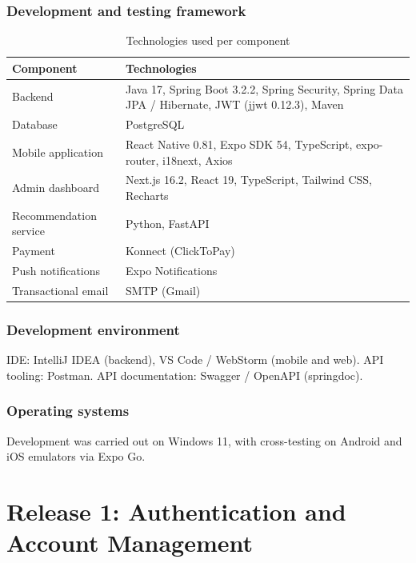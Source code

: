 \documentclass[a4paper,12pt]{report}
\begin{document}
\subsection{Development and testing framework}
\begin{table}[H]
\centering
\caption{Technologies used per component}
\begin{tabular}{|P{3.5cm}|P{9cm}|}
\hline
{}
\textbf{Component} & \textbf{Technologies} \\
\hline
Backend & Java 17, Spring Boot 3.2.2, Spring Security, Spring Data JPA / Hibernate, JWT (jjwt 0.12.3), Maven \\
\hline
Database & PostgreSQL \\
\hline
Mobile application & React Native 0.81, Expo SDK 54, TypeScript, expo-router, i18next, Axios \\
\hline
Admin dashboard & Next.js 16.2, React 19, TypeScript, Tailwind CSS, Recharts \\
\hline
Recommendation service & Python, FastAPI \\
\hline
Payment & Konnect (ClickToPay) \\
\hline
Push notifications & Expo Notifications \\
\hline
Transactional email & SMTP (Gmail) \\
\hline
\end{tabular}
\end{table}

\subsection{Development environment}
IDE: IntelliJ IDEA (backend), VS Code / WebStorm (mobile and web). API
tooling: Postman. API documentation: Swagger / OpenAPI (springdoc).

\subsection{Operating systems}
Development was carried out on Windows 11, with cross-testing on Android
and iOS emulators via Expo Go.

\chapter{Release 1: Authentication and Account Management}
\end{document}

